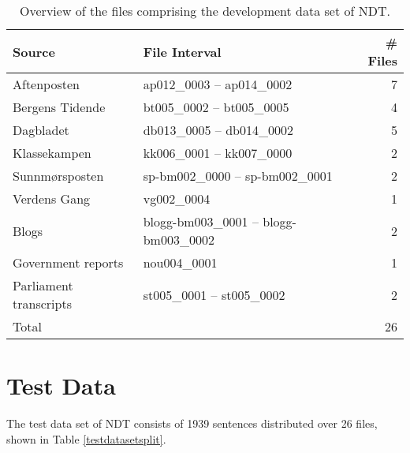 \documentclass[a4paper,12pt,english]{book}
\begin{document}
\begin{appendices}
    \begin{table}
        \centering
        \smaller[0.5]
        \begin{tabular}{@{}llr@{}}
            \toprule
            \textbf{Source} & \textbf{File Interval} & \textbf{\# Files} \\
            \midrule
            Aftenposten &  ap012\_0003 -- ap014\_0002 & 7 \\
            Bergens Tidende &  bt005\_0002 -- bt005\_0005 & 4 \\
            Dagbladet &  db013\_0005 -- db014\_0002 & 5 \\
            Klassekampen &  kk006\_0001 -- kk007\_0000 & 2 \\
            Sunnmørsposten &  sp-bm002\_0000 -- sp-bm002\_0001 & 2 \\
            Verdens Gang & vg002\_0004 & 1 \\
            Blogs & blogg-bm003\_0001 -- blogg-bm003\_0002 & 2 \\
            Government reports & nou004\_0001 & 1 \\
            Parliament transcripts &  st005\_0001 -- st005\_0002 & 2 \\
            \midrule
            Total & & 26 \\
            \bottomrule
        \end{tabular}
        \caption{Overview of the files comprising the development data set of
            NDT.}
        \label{devdatasetsplit}
    \end{table}

    \section{Test Data}
    The test data set of NDT consists of 1939 sentences distributed over 26
    files, shown in Table \ref{testdatasetsplit}.



\end{appendices}
\end{document}

